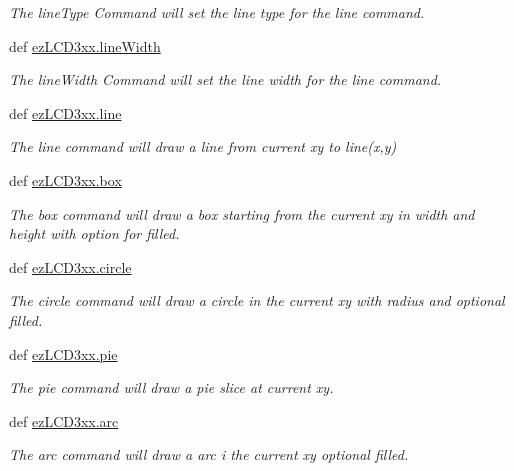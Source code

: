 \begin{DoxyCompactItemize}
\begin{DoxyCompactList}\small\item\em The line\-Type Command will set the line type for the line command. \end{DoxyCompactList}\item 
def \hyperlink{group___drawing_ga87b2625e7e4ffa927b4471003f8c6e70}{ez\-L\-C\-D3xx.\-line\-Width}
\begin{DoxyCompactList}\small\item\em The line\-Width Command will set the line width for the line command. \end{DoxyCompactList}\item 
def \hyperlink{group___drawing_gae70c22a0a810a70a0dd6d32c9fd7c066}{ez\-L\-C\-D3xx.\-line}
\begin{DoxyCompactList}\small\item\em The line command will draw a line from current xy to line(x,y) \end{DoxyCompactList}\item 
def \hyperlink{group___drawing_ga63bb01e1f5ef0fe2ae2acec0ed90e5bd}{ez\-L\-C\-D3xx.\-box}
\begin{DoxyCompactList}\small\item\em The box command will draw a box starting from the current xy in width and height with option for filled. \end{DoxyCompactList}\item 
def \hyperlink{group___drawing_gabfcfb31f2d88c7397332abcc6b324c7c}{ez\-L\-C\-D3xx.\-circle}
\begin{DoxyCompactList}\small\item\em The circle command will draw a circle in the current xy with radius and optional filled. \end{DoxyCompactList}\item 
def \hyperlink{group___drawing_ga12fb93d2d6f7ce3f08ad988c09624d57}{ez\-L\-C\-D3xx.\-pie}
\begin{DoxyCompactList}\small\item\em The pie command will draw a pie slice at current xy. \end{DoxyCompactList}\item 
def \hyperlink{group___drawing_ga13a0a8fb9c906a687f2a42864d973cc1}{ez\-L\-C\-D3xx.\-arc}
\begin{DoxyCompactList}\small\item\em The arc command will draw a arc i the current xy optional filled. \end{DoxyCompactList}\item 

\end{DoxyCompactItemize}

